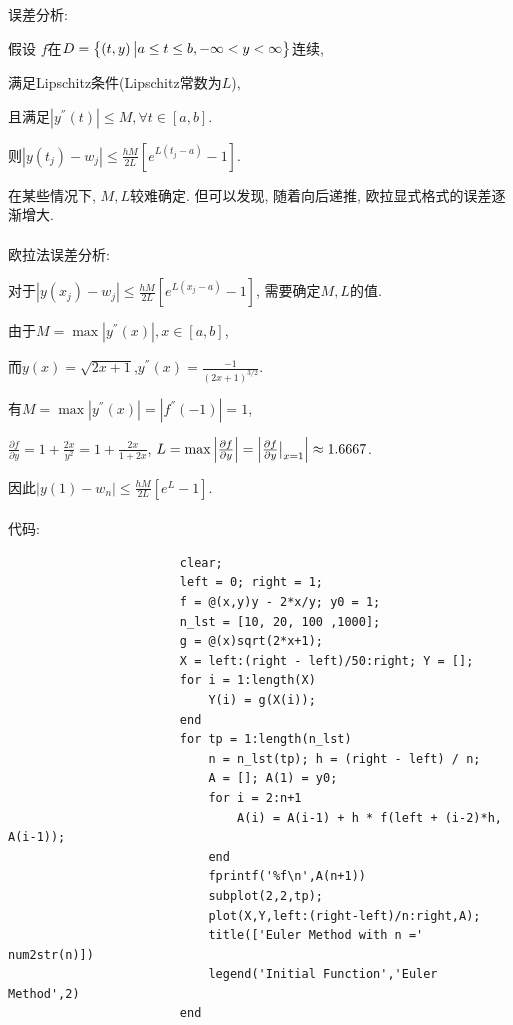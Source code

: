\documentclass{article}
\begin{document}
\begin{CJK*}{UTF8}{song}
					误差分析:
					
					假设 $f$在$D = \left\{\left(t,y\right) \big{|} a \leq t \leq b,-\infty < y < \infty \right\}$连续,
					
					满足Lipschitz条件(Lipschitz常数为$L$),
					
					且满足$\left|y^{''}\left(t\right) \right| \leq M,\forall t\in \left[a,b\right]$.
					
					则$\left|y\left(t_j\right) - w_j \right| \leq \frac{hM}{2L}\left[ e^{L\left(t_j-a\right)}-1\right]$.
					
					在某些情况下, $M,L$较难确定. 但可以发现, 随着向后递推, 欧拉显式格式的误差逐渐增大.\\ \\
					欧拉法误差分析:
					
					对于$\left|y\left(x_j\right) - w_j \right| \leq \frac{hM}{2L}\left[ e^{L\left(x_j-a\right)}-1\right]$, 需要确定$M,L$的值.
					
					由于$M = \max \left|y^{''}\left(x\right) \right|,x\in \left[a,b\right]$,
					
					而$y\left(x\right) = \sqrt{2x+1}$,$y^{''}\left(x\right) = \frac{-1}{\left(2x+1\right)^{3/2}}$.
					
					有$M = \max \left|y^{''}\left(x\right) \right| = \left|f^{''}\left(-1\right)\right| = 1$,
					
					$ \frac{\partial f}{\partial y} = 1+\frac{2x}{y^2} = 1+\frac{2x}{1+2x}$, $L = \max \left|\frac{\partial f}{\partial y} \right| = \left|\frac{\partial f}{\partial y} \big{|}_{x=1} \right| \approx 1.6667$.
					
					因此$\left|y\left(1\right) - w_{n} \right| \leq \frac{hM}{2L}\left[ e^{L}-1\right] $.\\ \\
					代码:
					\begin{lstlisting}
						clear;
						left = 0; right = 1;
						f = @(x,y)y - 2*x/y; y0 = 1;
						n_lst = [10, 20, 100 ,1000];
						g = @(x)sqrt(2*x+1);
						X = left:(right - left)/50:right; Y = [];
						for i = 1:length(X)
							Y(i) = g(X(i));
						end
						for tp = 1:length(n_lst)
							n = n_lst(tp); h = (right - left) / n;
							A = []; A(1) = y0;
							for i = 2:n+1
								A(i) = A(i-1) + h * f(left + (i-2)*h, A(i-1));
							end
							fprintf('%f\n',A(n+1))
							subplot(2,2,tp);
							plot(X,Y,left:(right-left)/n:right,A);
							title(['Euler Method with n =' num2str(n)])
							legend('Initial Function','Euler Method',2)
						end
					\end{lstlisting}
					

\end{CJK*}
\end{document}

